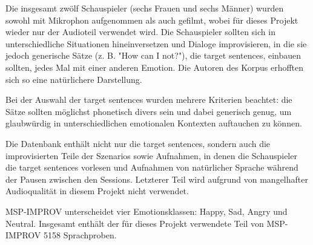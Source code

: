 \documentclass{article} %
\begin{document}
Die insgesamt zwölf Schauspieler (sechs Frauen und sechs Männer) wurden sowohl mit Mikrophon aufgenommen als auch gefilmt, wobei für dieses Projekt wieder nur der Audioteil verwendet wird. Die Schauspieler sollten sich in unterschiedliche Situationen hineinversetzen und Dialoge improvisieren, in die sie jedoch generische Sätze (z. B. "How can I not?"), die target sentences, einbauen sollten, jedes Mal mit einer anderen Emotion. Die Autoren des Korpus erhofften sich so eine natürlichere Darstellung. 

Bei der Auswahl der target sentences wurden mehrere Kriterien beachtet: die Sätze sollten möglichst phonetisch divers sein und dabei generisch genug, um glaubwürdig in unterschiedlichen emotionalen Kontexten auftauchen zu können. 

Die Datenbank enthält nicht nur die target sentences, sondern auch die improvisierten Teile der Szenarios sowie Aufnahmen, in denen die Schauspieler die target sentences vorlesen und Aufnahmen von natürlicher Sprache während der Pausen zwischen den Sessions. Letzterer Teil wird aufgrund von mangelhafter Audioqualität in diesem Projekt nicht verwendet. 

MSP-IMPROV unterscheidet vier Emotionsklassen: Happy, Sad, Angry und Neutral. Insgesamt enthält der für dieses Projekt verwendete Teil von MSP-IMPROV 5158 Sprachproben. 
\end{document}
